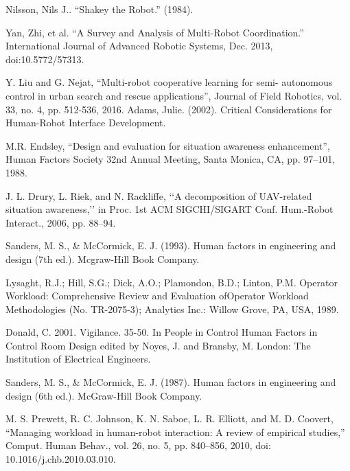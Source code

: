 \documentclass[conference]{IEEEtran}
\begin{document}
\newpage
\begin{thebibliography}{00}



 Nilsson, Nils J.. “Shakey the Robot.” (1984).

  Yan, Zhi, et al. “A Survey and Analysis of Multi-Robot Coordination.” International Journal of Advanced Robotic Systems, Dec. 2013, doi:10.5772/57313.
  

Y. Liu and G. Nejat, “Multi-robot cooperative learning for semi- autonomous control in urban search and rescue applications”, Journal of Field Robotics, vol. 33, no. 4, pp. 512-536, 2016.
Adams, Julie. (2002). Critical Considerations for Human-Robot Interface Development. 

M.R. Endsley, “Design and evaluation for situation awareness enhancement”, Human Factors Society 32nd Annual Meeting, Santa Monica, CA, pp. 97–101, 1988.











J. L. Drury, L. Riek, and N. Rackliffe, ‘‘A decomposition of UAV-related
situation awareness,’’ in Proc. 1st ACM SIGCHI/SIGART Conf. Hum.-Robot Interact., 2006, pp. 88–94.


Sanders, M. S., \& McCormick, E. J. (1993). Human factors in engineering and design (7th ed.). Mcgraw-Hill Book Company.

Lysaght, R.J.; Hill, S.G.; Dick, A.O.; Plamondon, B.D.; Linton, P.M. Operator Workload: Comprehensive Review and Evaluation ofOperator Workload Methodologies (No. TR-2075-3); Analytics Inc.: Willow Grove, PA, USA, 1989.




Donald, C. 2001. Vigilance. 35-50. In People in Control Human Factors in Control Room Design edited by Noyes, J. and Bransby, M. London: The Institution of Electrical Engineers.


Sanders, M. S., \& McCormick, E. J. (1987). Human factors in engineering and design (6th ed.). McGraw-Hill Book Company.



M. S. Prewett, R. C. Johnson, K. N. Saboe, L. R. Elliott, and M. D. Coovert, “Managing workload in human-robot interaction: A review of empirical studies,” Comput. Human Behav., vol. 26, no. 5, pp. 840–856, 2010, doi: 10.1016/j.chb.2010.03.010.


\end{thebibliography}
\end{document}
